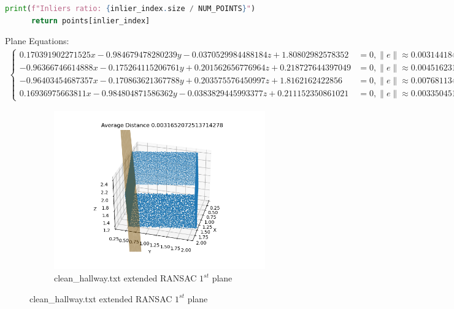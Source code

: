 \documentclass[conference,onecolumn]{IEEEtran}
\begin{document}
\begin{enumerate}[label=\arabic{enumi}.]
\begin{enumerate}
\begin{lstlisting}[language=Python]
      print(f"Inliers ratio: {inlier_index.size / NUM_POINTS}")
      return points[inlier_index]
                        \end{lstlisting}
                        Plane Equations:
                        \begin{align*}
                              \begin{cases}
                                    0.170391902271525x - 0.984679478280239y - 0.0370529984488184z + 1.80802982578352 & = 0, \|e\| \approx 0.003144184418150686 \\
                                    -0.96366746614888x - 0.175264115206761y + 0.201562656776964z + 0.218727644397049 & = 0, \|e\| \approx 0.00451623118244317  \\
                                    -0.96403454687357x - 0.170863621367788y + 0.203575576450997z + 1.8162162422856   & = 0, \|e\| \approx 0.007681134237631346 \\
                                    0.16936975663811x - 0.984804871586362y - 0.0383829445993377z + 0.211152350861021 & = 0, \|e\| \approx 0.003350451774268799
                              \end{cases}
                        \end{align*}
                        \begin{figure}[H]
                              \centering
                              \begin{subfigure}{.49\linewidth}
                                    \includegraphics[width=.99\linewidth]{figs/Q4_clean_hallway_plane_ransac_1.png}
                                    \caption{clean\_hallway.txt extended RANSAC $1^{st}$ plane}

\end{subfigure}
\end{figure}
\end{enumerate}
\end{enumerate}
\end{document}
